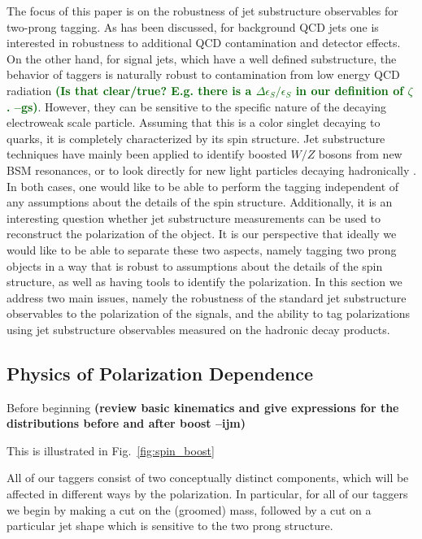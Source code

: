 \documentclass[11pt,letterpaper]{article}
\DeclareRobustCommand{\Fig}[1]{Fig.~\ref{#1}}
\newcommand{\ijm}[1]{\textbf{\textcolor{llblue}{(#1 --ijm)}}}
\newcommand{\gs}[1]{\textbf{\textcolor{darkgreen}{(#1 --gs)}}}
\begin{document}
The focus of this paper is on the robustness of jet substructure
observables for two-prong tagging.
%
As has been discussed, for
background QCD jets one is interested in robustness to additional QCD
contamination and detector effects.
%
On the other hand, for signal
jets, which have a well defined substructure, the behavior of taggers
is naturally robust to contamination from low energy QCD radiation
\gs{Is that clear/true? E.g. there is a $\Delta\epsilon_S/\epsilon_S$
  in our definition of $\zeta$.}.
  However, they can be sensitive to the
specific nature of the decaying electroweak scale particle.
%
Assuming
that this is a color singlet decaying to quarks, it is completely
characterized by its spin structure.
%
Jet substructure techniques have
mainly been applied to identify boosted $W/Z$ bosons from new BSM
resonances, or to look directly for new light particles decaying
hadronically \cite{CMS-PAS-EXO-17-001}.
%
In both cases, one would like
to be able to perform the tagging independent of any assumptions about
the details of the spin structure.
%
Additionally, it is an interesting
question whether jet substructure measurements can be used to
reconstruct the polarization of the object.
%
It is our perspective that
ideally we would like to be able to separate these two aspects, namely
tagging two prong objects in a way that is robust to assumptions about
the details of the spin structure, as well as having tools to identify
the polarization.
%
In this section we address two main issues, namely
the robustness of the standard jet substructure observables to the
polarization of the signals, and the ability to tag polarizations
using jet substructure observables measured on the hadronic decay
products.



\subsection{Physics of Polarization Dependence}\label{sec:polar_physics}

Before beginning \ijm{review basic kinematics and give expressions for the distributions before and after boost}

This is illustrated in \Fig{fig:spin_boost}



All of our taggers consist of two conceptually distinct components, which will be affected in different ways by the polarization.
%
In particular, for all of our taggers we begin by making a cut on the (groomed) mass, followed by a cut on a particular jet shape which is sensitive to the two prong structure.
\end{document}
